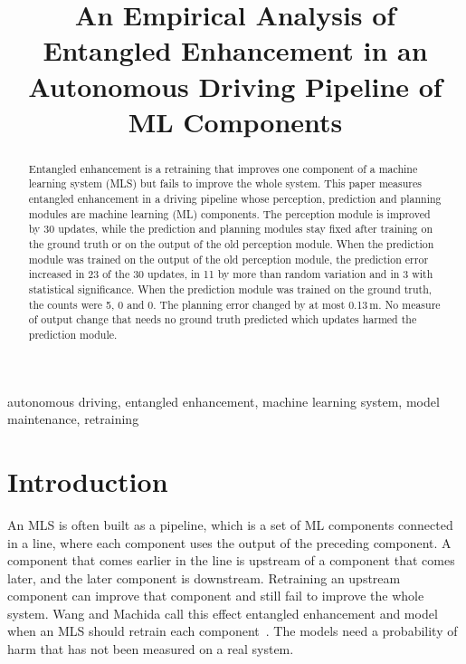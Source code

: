 \documentclass[conference]{IEEEtran}
\title{An Empirical Analysis of Entangled Enhancement in an Autonomous Driving Pipeline of ML Components}
\begin{document}
\maketitle
\thispagestyle{empty}


\begin{abstract}
Entangled enhancement is a retraining that improves one component of a machine
learning system (MLS) but fails to improve the whole system. This paper measures entangled enhancement in a driving pipeline whose perception, prediction and planning modules are machine learning (ML) components. The perception module is improved by 30 updates, while the prediction and planning modules stay fixed after training on the ground truth or on the output of the old perception module. When the prediction
module was trained on the output of the old perception module, the prediction
error increased in 23 of the 30 updates, in 11 by more than random variation and in 3 with statistical significance. When the prediction module was trained on
the ground truth, the counts were 5, 0 and 0. The planning error changed by at
most 0.13\,m. No measure of output change that needs no ground truth predicted which updates harmed the prediction module.
\end{abstract}

\begin{IEEEkeywords}
autonomous driving, entangled enhancement, machine learning system, model maintenance, retraining
\end{IEEEkeywords}

\section{Introduction}

An MLS is often built as a pipeline, which is a set of ML components connected
in a line, where each component uses the output of the preceding component. A
component that comes earlier in the line is upstream of a component that comes
later, and the later component is downstream. Retraining an upstream component
can improve that component and still fail to improve the whole system. Wang and Machida call this effect entangled enhancement and model when an MLS should retrain each component~\cite{wang2024compsac,wang2025issre}. The models need a probability of harm that has not been measured on a real system.
\end{document}
